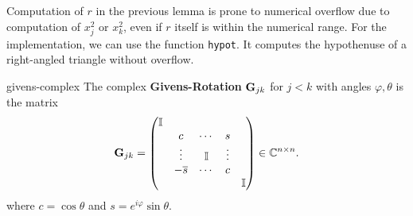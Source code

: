 \begin{remark}
  Computation of $r$ in the previous lemma is prone to numerical
  overflow due to computation of $x_j^2$ or $x_k^2$, even if $r$
  itself is within the numerical range. For the implementation, we can
  use the function \lstinline!hypot!. It computes the hypothenuse of a
  right-angled triangle without overflow.
\end{remark}

\begin{Definition}{givens-complex}
  The complex \textbf{Givens-Rotation} $\mathbf G_{jk}$ for $j<k$ with angles $\varphi,\theta$ is the matrix
  \begin{gather}
      \mathbf G_{jk} =
    \begin{pmatrix}
      \mathbb I \\
      &c&\cdots&s\\
      &\vdots&\mathbb I &\vdots\\
      &-\overline s&\cdots&c\\
      &&&&\mathbb I
    \end{pmatrix}
    \in\mathbb C^{n\times n}.
  \end{gather}
    where $c = \cos\theta$ and $s = e^{i\varphi}\sin\theta$.
\end{Definition}

